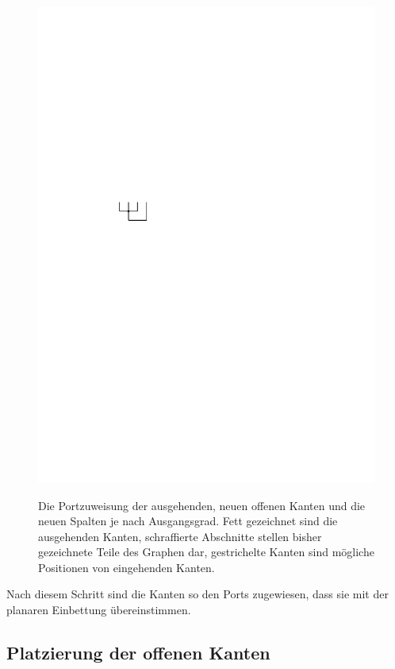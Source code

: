 \documentclass[a4paper]{scrreprt}
\theoremstyle{definition}
\begin{document}
\begin{figure}[h]
            {\includegraphics[scale=.8]{oc3_embed/outgoing/outdeg4}}

        \caption{Die Portzuweisung der ausgehenden, neuen offenen Kanten und die neuen Spalten je nach Ausgangsgrad. Fett gezeichnet sind die ausgehenden Kanten, schraffierte Abschnitte stellen bisher gezeichnete Teile des Graphen dar, gestrichelte Kanten sind mögliche Positionen von eingehenden Kanten.}
        \label{fig:embedout}
\end{figure}

Nach diesem Schritt sind die Kanten so den Ports zugewiesen, dass sie mit der planaren Einbettung übereinstimmen.

\subsection{Platzierung der offenen Kanten}
\end{document}
